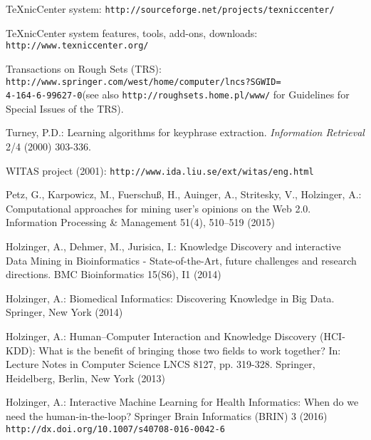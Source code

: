 \documentclass{llncs}
\begin{document}
\begin{thebibliography}{99}
 TeXnicCenter system:
\texttt{http://sourceforge.net/projects/texniccenter/}

 TeXnicCenter system features, tools, add-ons, downloads:\\
\texttt{http://www.texniccenter.org/}

 Transactions on Rough Sets (TRS):\\ \texttt{http://www.springer.com/west/home/computer/lncs?SGWID=}\\\texttt{4-164-6-99627-0}(see also \texttt{http://roughsets.home.pl/www/} for Guidelines for Special Issues of the TRS).

 Turney, P.D.: Learning algorithms for keyphrase extraction. \emph{Information Retrieval} 2/4 (2000) 303-336.

 WITAS project (2001):
\texttt{http://www.ida.liu.se/ext/witas/eng.html}

 Petz, G., Karpowicz, M., Fuerschuß, H., Auinger, A., Stritesky, V., Holzinger, A.: Computational approaches for mining user’s opinions on the Web 2.0. Information Processing \& Management 51(4), 510--519 (2015)

 Holzinger, A., Dehmer, M., Jurisica, I.: Knowledge Discovery and interactive Data Mining in Bioinformatics - State-of-the-Art, future challenges and research directions. BMC Bioinformatics 15(S6), I1 (2014)

 Holzinger, A.: Biomedical Informatics: Discovering Knowledge in Big Data. Springer, New York (2014)

 Holzinger, A.: Human–Computer Interaction and Knowledge Discovery ({HCI-KDD}): What is the benefit of bringing those two fields to work together? In: Lecture Notes in Computer Science LNCS 8127, pp. 319-328. Springer, Heidelberg, Berlin, New York (2013)
    
 Holzinger, A.: Interactive Machine Learning for Health Informatics: When do we need the human-in-the-loop? Springer Brain Informatics (BRIN) 3 (2016) \texttt{http://dx.doi.org/10.1007/s40708-016-0042-6}

\end{thebibliography}
\end{document}
